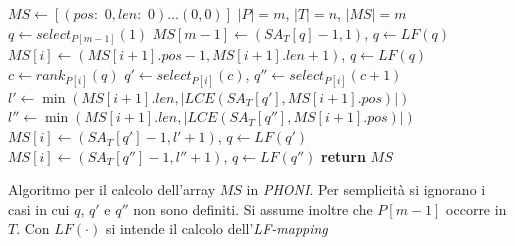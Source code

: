 \begin{algorithm}
  \small
  \begin{algorithmic}[1]
    \State $MS\gets [(pos:\,\,0,len:\,\,0)\ldots (0,0)]$
     \Comment $|P|=m$, $|T|=n$, $|MS|=m$
    \State $q\gets select_{P[m-1]}(1)$
    \State $MS[m-1]\gets (SA_T[q]-1,1)$, $q\gets LF(q)$
    \State $MS[i]\gets (MS[i+1].pos-1,MS[i+1].len+1)$, $q\gets LF(q)$
    \Else
    \State $c\gets rank_{P[i]}(q)$
    \State $q'\gets select_{P[i]}(c)$, $q''\gets select_{P[i]}(c+1)$
    \State $l'\gets \min\left(MS[i+1].len, \left|LCE(SA_T[q'],
    MS[i+1].pos)\right|\right)$
    \State $l''\gets \min\left(MS[i+1].len, \left|LCE(SA_T[q''],
    MS[i+1].pos)\right|\right)$ 
    \EndIf
    \State $MS[i]\gets (SA_T[q']-1,l'+1)$, $q\gets LF(q')$
    \Else
    \State $MS[i]\gets (SA_T[q'']-1,l''+1)$, $q\gets LF(q'')$
    \EndIf
    \EndFor
    \State \textbf{return} $MS$
    \EndFunction
  \end{algorithmic}
  \caption{Algoritmo per il calcolo dell'array $MS$ in \textit{PHONI}. Per
  semplicità si ignorano i casi in cui $q$, $q'$ e $q''$ non sono definiti. Si
  assume inoltre che $P[m-1]$ occorre in $T$. Con $LF(\cdot)$ si intende il
  calcolo dell'\textit{LF-mapping}}
  \label{algo:phonims}
\end{algorithm}
